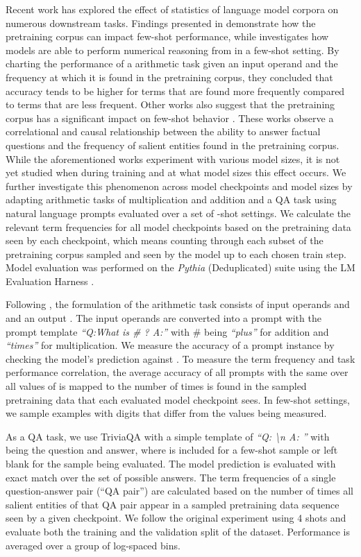 \documentclass{article}
\theoremstyle{plain}
\theoremstyle{definition}
\theoremstyle{remark}
\begin{document}
Recent work has explored the effect of statistics of language model corpora on numerous downstream tasks. Findings presented in \citet{shin2022effect} demonstrate how the pretraining corpus can impact few-shot performance, while \citet{razeghi2022impact} investigates how models are able to perform numerical reasoning from in a few-shot setting. By charting the performance of a arithmetic task given an input operand and the frequency at which it is found in the pretraining corpus, they concluded that accuracy tends to be higher for terms that are found more frequently compared to terms that are less frequent. Other works also suggest that the pretraining corpus has a significant impact on few-shot behavior \citep{elazar2022measuring,kandpal2022large}. These works observe a correlational and causal relationship between the ability to answer factual questions and the frequency of salient entities found in the pretraining corpus. While the aforementioned works experiment with various model sizes, it is not yet studied when during training and at what model sizes this effect occurs. We further investigate this phenomenon across model checkpoints and model sizes by adapting arithmetic tasks of multiplication and addition \citep{razeghi2022impact} and a QA task \citep{kandpal2022large} using natural language prompts evaluated over a set of -shot settings. We calculate the relevant term frequencies for all model checkpoints based on the pretraining data seen by each checkpoint, which means counting through each subset of the pretraining corpus sampled and seen by the model up to each chosen train step. Model evaluation was performed on the \textit{Pythia} (Deduplicated) suite using the LM Evaluation Harness \cite{gao2021eval}.

Following \citet{razeghi2022impact}, the formulation of the arithmetic task consists of input operands  and  and an output . The input operands are converted into a prompt with the prompt template \textit{``Q:What is  \# ? A:''} with \# being \textit{``plus''} for addition and \textit{``times''} for multiplication. We measure the accuracy of a prompt instance by checking the model's prediction against . To measure the term frequency and task performance correlation, the average accuracy of all prompts with the same  over all values of  is mapped to the number of times  is found in the sampled pretraining data that each evaluated model checkpoint sees. In few-shot settings, we sample examples with digits that differ from the  values being measured. 

As a QA task, we use TriviaQA \citep{joshi2017triviaqa} with a simple template of \textit{``Q:  \textbackslash n A: ''} with  being the question and  answer, where  is included for a few-shot sample or left blank for the sample being evaluated. The model prediction is evaluated with exact match over the set of possible answers. The term frequencies of a single question-answer pair (``QA pair'') are calculated based on the number of times all salient entities of that QA pair appear in a sampled pretraining data sequence seen by a given checkpoint. We follow the original experiment using 4 shots and evaluate both the training and the validation split of the dataset. Performance is averaged over a group of log-spaced bins. 
\end{document}
